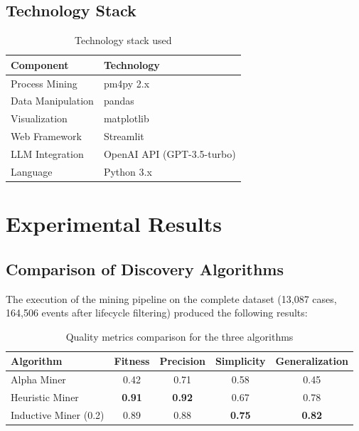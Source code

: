 \documentclass[a4paper,twoside,12pt]{article}
\begin{document}
\subsection{Technology Stack}

\begin{table}[H]
\centering
\begin{tabular}{ll}
\toprule
\textbf{Component} & \textbf{Technology} \\
\midrule
Process Mining & pm4py 2.x \\
Data Manipulation & pandas \\
Visualization & matplotlib \\
Web Framework & Streamlit \\
LLM Integration & OpenAI API (GPT-3.5-turbo) \\
Language & Python 3.x \\
\bottomrule
\end{tabular}
\caption{Technology stack used}
\label{tab:tech_stack}
\end{table}

\section{Experimental Results}

\subsection{Comparison of Discovery Algorithms}

The execution of the mining pipeline on the complete dataset (13,087 cases, 164,506 events after lifecycle filtering) produced the following results:

\begin{table}[H]
\centering
\begin{tabular}{lcccc}
\toprule
\textbf{Algorithm} & \textbf{Fitness} & \textbf{Precision} & \textbf{Simplicity} & \textbf{Generalization} \\
\midrule
Alpha Miner & 0.42 & 0.71 & 0.58 & 0.45 \\
Heuristic Miner & \textbf{0.91} & \textbf{0.92} & 0.67 & 0.78 \\
Inductive Miner (0.2) & 0.89 & 0.88 & \textbf{0.75} & \textbf{0.82} \\
\bottomrule
\end{tabular}
\caption{Quality metrics comparison for the three algorithms}
\label{tab:metrics_comparison}
\end{table}
\end{document}
